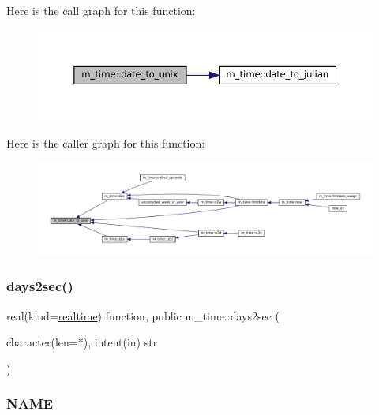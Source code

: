 Here is the call graph for this function\+:\nopagebreak
\begin{figure}[H]
\begin{center}
\leavevmode
\includegraphics[width=350pt]{namespacem__time_aed245c691853279ebf0ce899dec9caa9_cgraph}
\end{center}
\end{figure}
Here is the caller graph for this function\+:
\nopagebreak
\begin{figure}[H]
\begin{center}
\leavevmode
\includegraphics[width=350pt]{namespacem__time_aed245c691853279ebf0ce899dec9caa9_icgraph}
\end{center}
\end{figure}
\mbox{\label{namespacem__time_a99393c7906f1989f90ece03969224938}} 
\subsubsection{\texorpdfstring{days2sec()}{days2sec()}}
{\footnotesize\ttfamily real(kind=\mbox{\hyperlink{namespacem__time_ac10ea9e8d59ec74eaa7d89f2517d7422}{realtime}}) function, public m\+\_\+time\+::days2sec (\begin{DoxyParamCaption}\item[{character(len=$\ast$), intent(in)}]{str }\end{DoxyParamCaption})}



\subsubsection*{N\+A\+ME}

